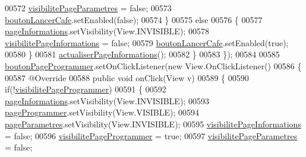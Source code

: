 \begin{DoxyCode}
00572                     \hyperlink{classcom_1_1example_1_1ekawa_1_1_ihm_abc6f7d562f994f120a9034a9e11b72d0}{visibilitePageParametres} = \textcolor{keyword}{false};
00573                     \hyperlink{classcom_1_1example_1_1ekawa_1_1_ihm_af64465b03533ddddfaac1a55b0f14012}{boutonLancerCafe}.setEnabled(\textcolor{keyword}{false});
00574                 \}
00575                 \textcolor{keywordflow}{else}
00576                 \{
00577                     \hyperlink{classcom_1_1example_1_1ekawa_1_1_ihm_a554ab8cbe600e837516ec78e62312fea}{pageInformations}.setVisibility(View.INVISIBLE);
00578                     \hyperlink{classcom_1_1example_1_1ekawa_1_1_ihm_a3a1aee8b3e12447c5a73aa16de64b1f0}{visibilitePageInformations} = \textcolor{keyword}{false};
00579                     \hyperlink{classcom_1_1example_1_1ekawa_1_1_ihm_af64465b03533ddddfaac1a55b0f14012}{boutonLancerCafe}.setEnabled(\textcolor{keyword}{true});
00580                 \}
00581                 \hyperlink{classcom_1_1example_1_1ekawa_1_1_ihm_a2422719a8e893b23e95f80b5899adb76}{actualiserPageInformations}();
00582             \}
00583         \});
00584 
00585         \hyperlink{classcom_1_1example_1_1ekawa_1_1_ihm_a15ad5787c0800a7a2e2f00964787255f}{boutonPageProgrammer}.setOnClickListener(\textcolor{keyword}{new} View.OnClickListener()
00586         \{
00587             @Override
00588             \textcolor{keyword}{public} \textcolor{keywordtype}{void} onClick(View v)
00589             \{
00590                 \textcolor{keywordflow}{if}(!\hyperlink{classcom_1_1example_1_1ekawa_1_1_ihm_a1db719bfa9b48f6c1f64259e37703963}{visibilitePageProgrammer})
00591                 \{
00592                     \hyperlink{classcom_1_1example_1_1ekawa_1_1_ihm_a554ab8cbe600e837516ec78e62312fea}{pageInformations}.setVisibility(View.INVISIBLE);
00593                     \hyperlink{classcom_1_1example_1_1ekawa_1_1_ihm_a9a3747e82c5917a681a8d8a726cd5fa8}{pageProgrammer}.setVisibility(View.VISIBLE);
00594                     \hyperlink{classcom_1_1example_1_1ekawa_1_1_ihm_a12537211f4d695c3dc62713da00ffa35}{pageParametres}.setVisibility(View.INVISIBLE);
00595                     \hyperlink{classcom_1_1example_1_1ekawa_1_1_ihm_a3a1aee8b3e12447c5a73aa16de64b1f0}{visibilitePageInformations} = \textcolor{keyword}{false};
00596                     \hyperlink{classcom_1_1example_1_1ekawa_1_1_ihm_a1db719bfa9b48f6c1f64259e37703963}{visibilitePageProgrammer} = \textcolor{keyword}{true};
00597                     \hyperlink{classcom_1_1example_1_1ekawa_1_1_ihm_abc6f7d562f994f120a9034a9e11b72d0}{visibilitePageParametres} = \textcolor{keyword}{false};

\end{DoxyCode}
